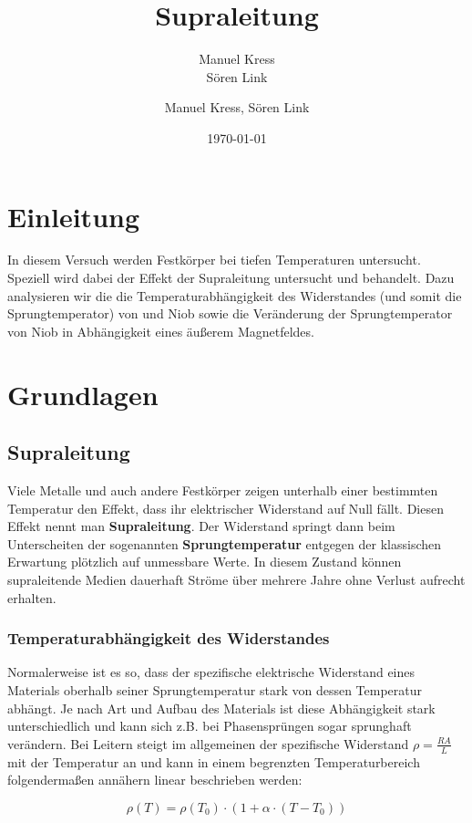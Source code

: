 \documentclass[bigchapter,colorback,accentcolor=tud4b,linedtoc,11pt]{tudreport}
\title{Supraleitung}
\subtitle{Manuel Kress  \\Sören Link}
\author{Manuel Kress, Sören Link}
\date{\today}
\numberwithin{equation}{subsection}
\begin{document}
\maketitle

\tableofcontents


\chapter{Einleitung}
In diesem Versuch werden Festkörper bei tiefen Temperaturen untersucht. Speziell wird dabei der Effekt der Supraleitung untersucht und behandelt. Dazu analysieren wir die die Temperaturabhängigkeit des Widerstandes (und somit die Sprungtemperator) von  und Niob sowie die Veränderung der Sprungtemperator von Niob in Abhängigkeit eines äußerem Magnetfeldes.
\chapter{Grundlagen}
\section{Supraleitung}
Viele Metalle und auch andere Festkörper zeigen unterhalb einer bestimmten Temperatur den Effekt, dass ihr elektrischer Widerstand auf Null fällt. Diesen Effekt nennt man \textbf{Supraleitung}. Der Widerstand springt dann beim Unterscheiten der sogenannten \textbf{Sprungtemperatur} entgegen der klassischen Erwartung plötzlich auf unmessbare Werte. In diesem Zustand können supraleitende Medien dauerhaft Ströme über mehrere Jahre ohne Verlust aufrecht erhalten.

\subsection{Temperaturabhängigkeit des Widerstandes}
Normalerweise ist es so, dass der spezifische elektrische Widerstand eines Materials oberhalb seiner Sprungtemperatur stark von dessen Temperatur abhängt. Je nach Art und Aufbau des Materials ist diese Abhängigkeit stark unterschiedlich und kann sich z.B. bei Phasensprüngen sogar sprunghaft verändern. Bei Leitern steigt im allgemeinen der spezifische Widerstand \(\rho = \frac{RA}{L}\) mit der Temperatur an und kann in einem begrenzten Temperaturbereich folgendermaßen annähern linear  beschrieben werden:

\[\rho(T) = \rho(T_0) \cdot (1 + \alpha \cdot (T-T_0))\]
\end{document}
